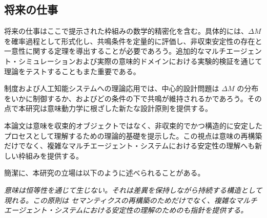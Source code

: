 \documentclass[11pt,a4paper]{article}
\theoremstyle{definition}
\begin{document}
\subsection{将来の仕事}

将来の仕事はここで提示された枠組みの数学的精密化を含む。具体的には、$\Delta M$ を確率過程として形式化し、共鳴条件を定量的に評価し、非収束安定性の存在と一意性に関する定理を導出することが必要であろう。追加的なマルチエージェント・シミュレーションおよび実際の意味的ドメインにおける実験的検証を通じて理論をテストすることもまた重要である。

制度および人工知能システムへの理論応用では、中心的設計問題は $\Delta M$ の分布をいかに制御するか、およびどの条件の下で共鳴が維持されるかであろう。その点で本研究は意味動力学に根ざした新たな設計原則を提供する。

本論文は意味を収束的オブジェクトではなく、非収束的でかつ構造的に安定したプロセスとして理解するための理論的基礎を提示した。この視点は意味の再構築だけでなく、複雑なマルチエージェント・システムにおける安定性の理解へも新しい枠組みを提供する。

簡潔に、本研究の立場は以下のように述べられることがある。

\textit{意味は恒等性を通じて生じない。それは差異を保持しながら持続する構造として現れる。この原則は セマンティクスの再構築のためだけでなく、複雑なマルチエージェント・システムにおける安定性の理解のためのも指針を提供する。}
\end{document}
